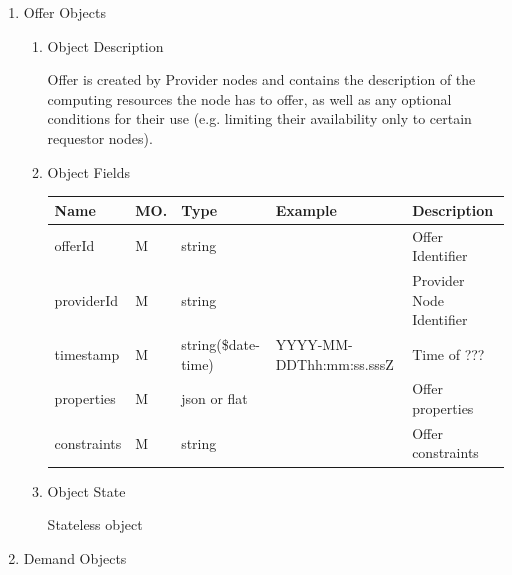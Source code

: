 \begin{enumerate}

\item Offer Objects

\begin{enumerate}

\item Object Description

Offer is created by Provider nodes and contains the description of the
computing resources the node has to offer, as well as any optional conditions
for their use (e.g. limiting their availability only to certain requestor nodes).

\item Object Fields

\begin{table}[H]
\footnotesize

\begin{center}
\begin{tabular}{|p{3cm}|l|p{3cm}|p{3cm}|p{4cm}|} 
\hline
\rowcolor{lightgray}	Name	& MO.	& Type	& Example & 	Description \\
\hline

offerId 	& M & string & 		& Offer Identifier \\
\hline 		

providerId & M & string  & 		& Provider Node Identifier \\
\hline

timestamp	& M	& 	string(\$date-time)	& YYYY-MM-DDThh:mm:ss.sssZ	&	Time of ???  \\
\hline

properties	& M	& 	json or flat	&		&	Offer properties \\ 
\hline

constraints	& M	& 	string	&		&	Offer constraints \\ 
\hline

\end{tabular}
\end{center}

\end{table}

\item Object State

Stateless object

\end{enumerate}

\item Demand Objects

\begin{enumerate}


\end{enumerate}
\end{enumerate}
